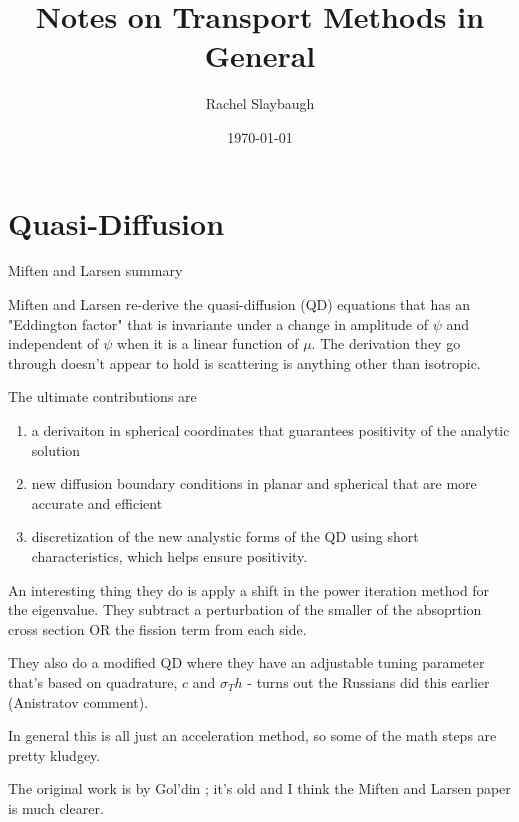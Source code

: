 \documentclass[12pt,twoside]{article}
\date{\today}
\title{Notes on Transport Methods in General}
\author{Rachel Slaybaugh}
\begin{document}
\maketitle

\section{Quasi-Diffusion}

Miften and Larsen summary \cite{Miften1993}

Miften and Larsen re-derive the quasi-diffusion (QD) equations that has an "Eddington factor" that is invariante under a change in amplitude of $\psi$ and independent of $\psi$ when it is a linear function of $\mu$. The derivation they go through doesn't appear to hold is scattering is anything other than isotropic.

The ultimate contributions are
\begin{enumerate}
\item a derivaiton in spherical coordinates that guarantees positivity of the analytic solution
\item new diffusion boundary conditions in planar and spherical that are more accurate and efficient
\item discretization of the new analystic forms of the QD using short characteristics, which helps ensure positivity.
\end{enumerate} 

An interesting thing they do is apply a shift in the power iteration method for the eigenvalue. They subtract a perturbation of the smaller of the absoprtion cross section OR the fission term from each side. 

They also do a modified QD where they have an adjustable tuning parameter that's based on quadrature, $c$ and $\sigma_T h$ - turns out the Russians did this earlier (Anistratov comment). 

In general this is all just an acceleration method, so some of the math steps are pretty kludgey. 


\vspace*{2em}
The original work is by Gol'din \cite{Goldin1964}; it's old and I think the Miften and Larsen paper is much clearer. 



\end{document}
